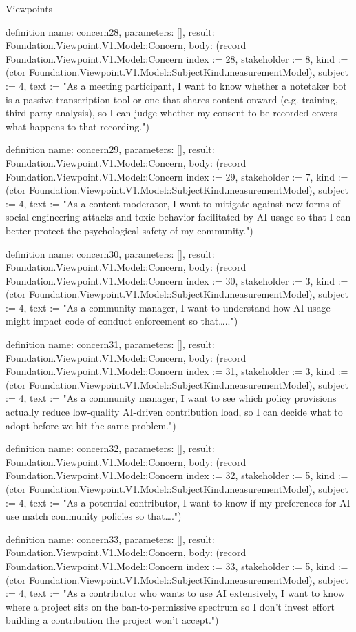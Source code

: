 \begin{lexlean}{Viewpoints}
\begin{semanticmodule}
definition{
  name: concern28,
  parameters: [],
  result: Foundation.Viewpoint.V1.Model::Concern,
  body: (record Foundation.Viewpoint.V1.Model::Concern {index := 28, stakeholder := 8, kind := (ctor Foundation.Viewpoint.V1.Model::SubjectKind.measurementModel), subject := 4, text := "As a meeting participant, I want to know whether a notetaker bot is a passive transcription tool or one that shares content onward (e.g. training, third-party analysis), so I can judge whether my consent to be recorded covers what happens to that recording."})
}

definition{
  name: concern29,
  parameters: [],
  result: Foundation.Viewpoint.V1.Model::Concern,
  body: (record Foundation.Viewpoint.V1.Model::Concern {index := 29, stakeholder := 7, kind := (ctor Foundation.Viewpoint.V1.Model::SubjectKind.measurementModel), subject := 4, text := "As a content moderator, I want to mitigate against new forms of social engineering attacks and toxic behavior facilitated by AI usage so that I can better protect the psychological safety of my community."})
}

definition{
  name: concern30,
  parameters: [],
  result: Foundation.Viewpoint.V1.Model::Concern,
  body: (record Foundation.Viewpoint.V1.Model::Concern {index := 30, stakeholder := 3, kind := (ctor Foundation.Viewpoint.V1.Model::SubjectKind.measurementModel), subject := 4, text := "As a community manager, I want to understand how AI usage might impact code of conduct enforcement so that….."})
}

definition{
  name: concern31,
  parameters: [],
  result: Foundation.Viewpoint.V1.Model::Concern,
  body: (record Foundation.Viewpoint.V1.Model::Concern {index := 31, stakeholder := 3, kind := (ctor Foundation.Viewpoint.V1.Model::SubjectKind.measurementModel), subject := 4, text := "As a community manager, I want to see which policy provisions actually reduce low-quality AI-driven contribution load, so I can decide what to adopt before we hit the same problem."})
}

definition{
  name: concern32,
  parameters: [],
  result: Foundation.Viewpoint.V1.Model::Concern,
  body: (record Foundation.Viewpoint.V1.Model::Concern {index := 32, stakeholder := 5, kind := (ctor Foundation.Viewpoint.V1.Model::SubjectKind.measurementModel), subject := 4, text := "As a potential contributor, I want to know if my preferences for AI use match community policies so that…."})
}

definition{
  name: concern33,
  parameters: [],
  result: Foundation.Viewpoint.V1.Model::Concern,
  body: (record Foundation.Viewpoint.V1.Model::Concern {index := 33, stakeholder := 5, kind := (ctor Foundation.Viewpoint.V1.Model::SubjectKind.measurementModel), subject := 4, text := "As a contributor who wants to use AI extensively, I want to know where a project sits on the ban-to-permissive spectrum so I don't invest effort building a contribution the project won't accept."})
}


\end{semanticmodule}
\end{lexlean}
